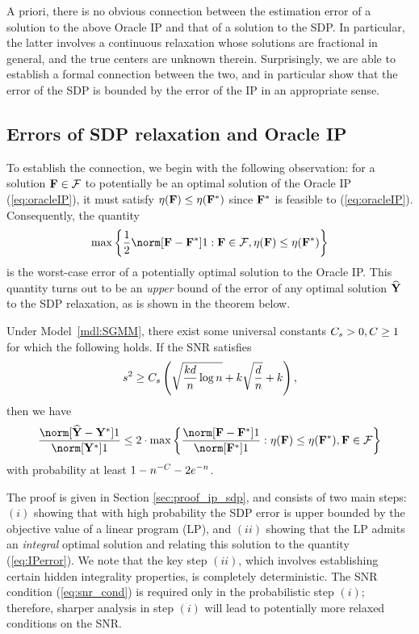 A priori, there is no obvious connection between the estimation error
of a solution to the above Oracle IP and that of a solution to the
SDP. In particular, the latter involves a continuous relaxation whose
solutions are fractional in general, and the true centers are unknown
therein. Surprisingly, we are able to establish a formal connection
between the two, and in particular show that the error of the SDP
is bounded by the error of the IP in an appropriate sense.

\subsection{Errors of SDP relaxation and Oracle IP}

To establish the connection, we begin with the following observation:
for a solution $\mathbf{F}\in\mathcal{F}$ to potentially be an optimal solution
of the Oracle IP (\ref{eq:oracleIP}), it must satisfy $\eta(\mathbf{F})\le\eta(\mathbf{F}^{*})$
since $\mathbf{F}^{*}$ is feasible to (\ref{eq:oracleIP}). Consequently,
the quantity 
\begin{equation}
\max\left\{ \frac{1}{2}\norm[\F-\F^{*}]1:\F\in\mathcal{F},\eta(\F)\le\eta(\F^{*})\right\} \label{eq:IPerror}
\end{equation}
is the worst-case error of a potentially optimal solution to the Oracle
IP. This quantity turns out to be an \emph{upper} bound of the error
of any optimal solution $\widehat{\mathbf{Y}}$ to the SDP relaxation, as is shown
in the theorem below.
\begin{thm}
\emph{\label{thm:ip_sdp} }Under Model~\ref{mdl:SGMM}, there exist
some universal constants $C_{s}>0,C\ge1$ for which the following
holds. If the SNR satisfies 
\begin{equation}
s^{2}\geq C_{s}\left(\sqrt{\frac{kd}{n}\log n}+k\sqrt{\frac{d}{n}}+k\right),\label{eq:snr_cond}
\end{equation}
then we have
\[
\frac{\norm[\Yhat-\Ystar]1}{\norm[\Ystar]1}\le2\cdot\max\left\{ \frac{\norm[\F-\F^{*}]1}{\norm[\F^{*}]1}:\eta(\F)\le\eta(\F^{*}),\F\in\mathcal{F}\right\} 
\]
with probability at least $1-n^{-C}-2e^{-n}$. 
\end{thm}
The proof is given in Section \ref{sec:proof_ip_sdp}, and consists
of two main steps: $(i)$ showing that with high probability the SDP
error is upper bounded by the objective value of a linear program
(LP), and $(ii)$ showing that the LP admits an \emph{integral} optimal
solution and relating this solution to the quantity (\ref{eq:IPerror}).
We note that the key step $(ii)$, which involves establishing certain
hidden integrality properties, is completely deterministic. The SNR
condition (\ref{eq:snr_cond}) is required only in the probabilistic
step $(i)$; therefore, sharper analysis in step $(i)$ will lead
to potentially more relaxed conditions on the SNR.\\

